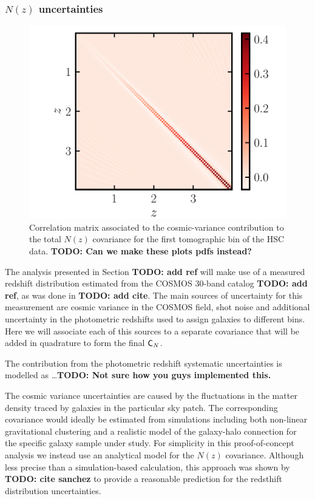 \documentclass[a4paper,11pt]{article}
\newcommand{\todo}[1]{{\bf TODO: #1}}
\begin{document}
      \subsubsection{$N(z)$ uncertainties}\label{sssec:theory.prior.cv}
        \begin{figure}[ht]
          \centering  
          \includegraphics[width=1.\textwidth]{./corr_CV_0}
          \caption{Correlation matrix associated to the cosmic-variance contribution to the total $N(z)$ covariance for the first tomographic bin of the HSC data. \todo{Can we make these plots pdfs instead?}}\label{fig:CV}
        \end{figure}
        The analysis presented in Section \todo{add ref} will make use of a measured redshift distribution estimated from the COSMOS 30-band catalog \todo{add ref}, as was done in \todo{add cite}. The main sources of uncertainty for this measurement are cosmic variance in the COSMOS field, shot noise and additional uncertainty in the photometric redshifts used to assign galaxies to different bins. Here we will associate each of this sources to a separate covariance that will be added in quadrature to form the final ${\sf C}_N$.
        
        The contribution from the photometric redshift systematic uncertainties is modelled as \ldots\todo{Not sure how you guys implemented this.}
        
        The cosmic variance uncertainties are caused by the fluctuations in the matter density traced by galaxies in the particular sky patch. The corresponding covariance would ideally be estimated from simulations including both non-linear gravitational clustering and a realistic model of the galaxy-halo connection for the specific galaxy sample under study. For simplicity in this proof-of-concept analysis we instead use an analytical model for the $N(z)$ covariance. Although less precise than a simulation-based calculation, this approach was shown by \todo{cite sanchez} to provide a reasonable prediction for the redsthift distribution uncertainties.
\end{document}

